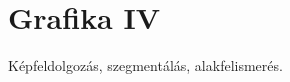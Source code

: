 \documentclass[../../main.tex]{subfiles}
\begin{document}
\section{Grafika IV}

\begin{fulltheorem}
	Képfeldolgozás, szegmentálás, alakfelismerés.
\end{fulltheorem}
\end{document}
